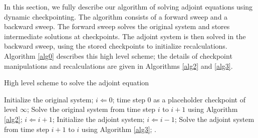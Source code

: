 \documentclass[oneeqnum, onethmnum, onefignum, onetabnum]{siamltex}
\begin{document}
In this section, we fully describe our algorithm of solving adjoint equations
using dynamic checkpointing.  The algorithm consists of a forward sweep and
a backward sweep.  The forward sweep solves the original system and stores
intermediate solutions at checkpoints.  The adjoint system is then solved in
the backward sweep, using the stored checkpoints to initialize recalculations.
Algorithm \ref{alg0} describes this high level scheme; the details of
checkpoint manipulations and recalculations are given in Algorithms \ref{alg2}
and \ref{alg3}.
\begin{algorithm}
\caption{High level scheme to solve the adjoint equation}
\label{alg0}
\begin{algorithmic}[indent=3em]
    \STATE Initialize the original system;
    \STATE $i \Leftarrow 0$;
     time step 0 as a placeholder checkpoint of level $\infty$;
        \STATE Solve the original system from time step $i$ to $i + 1$ using
               Algorithm \ref{alg2};
        \STATE $i \Leftarrow i + 1$;
    \ENDWHILE
    \STATE Initialize the adjoint system;
        \STATE $i \Leftarrow i - 1$;
        \STATE Solve the adjoint system from time step $i + 1$ to $i$ using
               Algorithm \ref{alg3};
    \ENDWHILE .
\end{algorithmic}
\end{algorithm}
\end{document}
